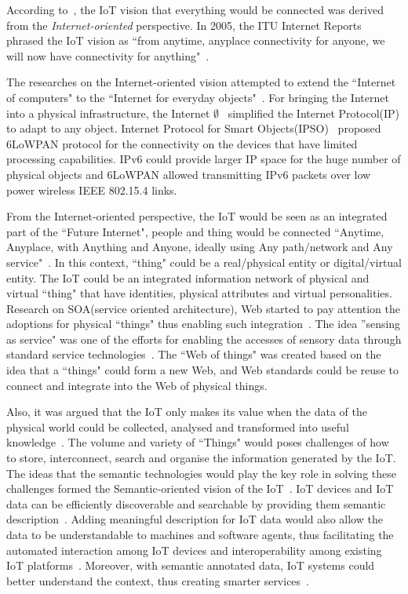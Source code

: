 According to~\cite{Atzori:2010}, the IoT vision that everything would be connected was derived from the \textit{Internet-oriented} perspective.
In 2005, the ITU Internet Reports phrased the IoT vision as ``from anytime, anyplace connectivity for anyone, we will now have connectivity for anything"~\citep{ITU:2005}.

The researches on the Internet-oriented vision attempted to extend the ``Internet of computers" to the ``Internet for everyday objects"~\citep{Mattern:2010}.
For bringing the Internet into a physical infrastructure, the Internet $\emptyset$~\citep{Gershenfeld:2006} simplified the Internet Protocol(IP) to adapt to any object.
Internet Protocol for Smart Objects(IPSO)~\citep{Dunkels:2008} proposed 6LoWPAN protocol for the connectivity on the devices that have limited processing capabilities.
IPv6 could provide larger IP space for the huge number of physical objects and 6LoWPAN allowed transmitting IPv6 packets over low power wireless IEEE 802.15.4 links.

From the Internet-oriented perspective, the IoT would be seen as an integrated part of the ``Future Internet", people and thing would be connected ``Anytime, Anyplace, with Anything and Anyone, ideally using Any path/network and Any service"~\citep{Sundmaeker:2010}.
In this context, ``thing" could be a real/physical entity or digital/virtual entity.
The IoT could be an integrated information network of physical and virtual ``thing" that have identities, physical attributes and virtual personalities.  
Research on SOA(service oriented architecture), Web started to pay attention the adoptions for physical ``things" thus enabling such integration~\citep{De:2011, De:2012,Guinard:2009}. 
The idea ''sensing as service" was one of the efforts for enabling the accesses of sensory data through standard service technologies~\citep{Perera:2014a}. 
The ``Web of things" was created based on the idea that a ``things" could form a new Web, and Web standards could be reuse to connect and integrate into the Web of physical things.

Also, it was argued that the IoT only makes its value when the data of the physical world could be collected, analysed and transformed into useful knowledge~\citep{Vermesan:2011}.
The volume and variety of ``Things" would poses challenges of how to store, interconnect, search and organise the information generated by the IoT. 
The ideas that the semantic technologies would play the key role in solving these challenges formed the Semantic-oriented vision of the IoT~\citep{Atzori:2014,Barnaghi:2012}.
IoT devices and IoT data can be efficiently discoverable and searchable by providing them semantic description~\citep{Ioan:2009, Chun:2015,Serena:2017}. 
Adding meaningful description for IoT data would also allow the data to be understandable to machines and software agents, thus facilitating the automated interaction among IoT devices and interoperability among existing IoT platforms~\citep{IERC:2015, Ganzha:2017}. 
Moreover, with semantic annotated data, IoT systems could better understand the context, thus creating smarter services~\citep{Perera:2014a}. 

